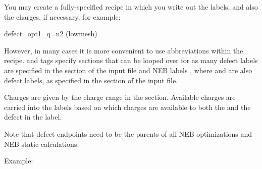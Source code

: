 \documentclass[letterpaper,10pt,english]{sphinxmanual}
\begin{document}
You may create a fully-specified recipe in which you write out the labels, and also the charges, if necessary, for example:

defect\_opt1\_q=n2 (lowmesh)

However, in many cases it is more convenient to use abbreviations within the recipe.
 and  tags specify sections that can be looped over for as many defect labels  are specified in the  section of the input file and NEB labels , where  and  are also defect labels, as specified in the  section of the input file.

Charges  are given by the charge range in the  section. Available charges are carried into the  labels based on which charges are available to both the  and the  defect in the label.

Note that defect endpoints need to be the parents of all NEB optimizations and NEB static calculations.

Example:
\end{document}

